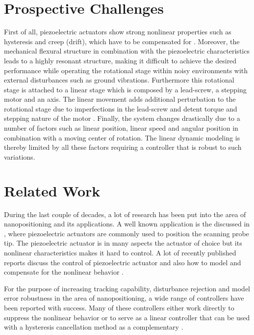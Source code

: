 \newpage
\section{Prospective Challenges}\label{sec:prospectiveChallanges}
First of all, piezoelectric actuators show strong nonlinear properties such as hysteresis and creep (drift), which have to be compensated for \citep{Piezo:2008}. Moreover, the mechanical flexural structure in combination with the piezoelectric characteristics leads to a highly resonant structure, making it difficult to achieve the desired performance while operating the rotational stage within noisy environments with external disturbances such as ground vibrations. Furthermore this rotational stage is attached to a linear stage which is composed by a lead-screw, a stepping motor and an axis. The linear movement adds additional perturbation to the rotational stage due to imperfections in the lead-screw and detent torque and stepping nature of the motor \citep{ButcherController:2015}. Finally, the system changes drastically due to a number of factors such as linear position, linear speed and angular position in combination with a moving center of rotation. The linear dynamic modeling is thereby limited by all these factors requiring a controller that is robust to such variations.

\section{Related Work}
During the last couple of decades, a lot of research has been put into the area of nanopositioning and its applications. A well known application is the \abbrAFM discussed in \citep{chuang2013robust, SurveyOfControlIssues:2007}, where piezoelectric actuators are commonly used to position the scanning probe tip. The piezoelectric actuator is in many aspects the actuator of choice but its nonlinear characteristics makes it hard to control. A lot of recently published reports discuss the control of piezoelectric actuator \citep{gu2013motion, gu2016modeling} and also how to model and compensate for the nonlinear behavior \citep{Biggio:2014,ButcherIdentification:2015,Maxwell:2012,leang2002hysteresis}.

For the purpose of increasing tracking capability, disturbance rejection and model error robustness in the area of nanopositioning, a wide range of controllers have been reported with success. Many of these controllers either work directly to suppress the nonlinear behavior \citep{ompc, Elmali:1996, xu2014model} or to serve as a linear controller that can be used with a hysteresis cancellation method as a complementary \citep{inputshaper, gu:2014}.

